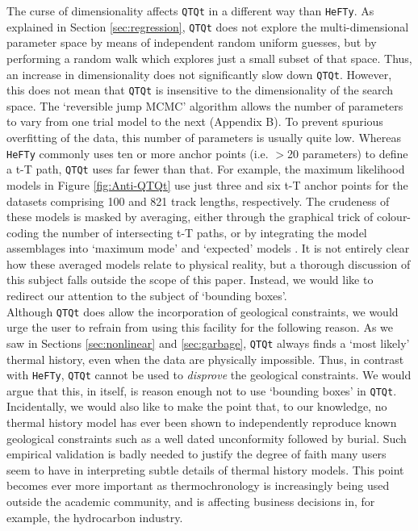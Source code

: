 \documentclass{article}
\begin{document}
The curse of dimensionality affects {\tt QTQt} in a different way than
{\tt HeFTy}. As explained in Section \ref{sec:regression}, {\tt QTQt}
does not explore the multi-dimensional parameter space by means of
independent random uniform guesses, but by performing a random walk
which explores just a small subset of that space. Thus, an increase in
dimensionality does not significantly slow down {\tt QTQt}. However,
this does not mean that {\tt QTQt} is insensitive to the
dimensionality of the search space. The `reversible jump MCMC'
algorithm allows the number of parameters to vary from one trial model
to the next (Appendix B). To prevent spurious overfitting of the data,
this number of parameters is usually quite low. Whereas {\tt HeFTy}
commonly uses ten or more anchor points (i.e. $>$20 parameters) to
define a t-T path, {\tt QTQt} uses far fewer than that. For example,
the maximum likelihood models in Figure \ref{fig:Anti-QTQt} use just
three and six t-T anchor points for the datasets comprising 100 and
821 track lengths, respectively. The crudeness of these models is
masked by averaging, either through the graphical trick of
colour-coding the number of intersecting t-T paths, or by integrating
the model assemblages into `maximum mode' and `expected' models
\cite{sambridge2006, gallagher2012}. It is not entirely clear how
these averaged models relate to physical reality, but a thorough
discussion of this subject falls outside the scope of this
paper. Instead, we would like to redirect our attention to the subject
of `bounding boxes'.\\

Although {\tt QTQt} does allow the incorporation of geological
constraints, we would urge the user to refrain from using this
facility for the following reason.  As we saw in Sections
\ref{sec:nonlinear} and \ref{sec:garbage}, {\tt QTQt} always finds a
`most likely' thermal history, even when the data are physically
impossible. Thus, in contrast with {\tt HeFTy}, {\tt QTQt} cannot be
used to \emph{disprove} the geological constraints. We would argue
that this, in itself, is reason enough not to use `bounding boxes' in
{\tt QTQt}. Incidentally, we would also like to make the point that,
to our knowledge, no thermal history model has ever been shown to
independently reproduce known geological constraints such as a well
dated unconformity followed by burial.  Such empirical validation is
badly needed to justify the degree of faith many users seem to have in
interpreting subtle details of thermal history models.  This point
becomes ever more important as thermochronology is increasingly being
used outside the academic community, and is affecting business
decisions in, for example, the hydrocarbon industry.
\end{document}
